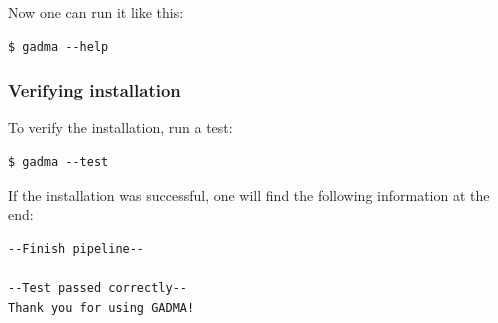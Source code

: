\documentclass[12pt]{article}
\begin{document}
Now one can run it like this:
\begin{lstlisting}
$ gadma --help
\end{lstlisting}

\subsubsection{Verifying installation}
To verify the installation, run a test:

\begin{lstlisting}
$ gadma --test
\end{lstlisting}

If the installation was successful, one will find the following information at the end:
\begin{lstlisting}
--Finish pipeline--

--Test passed correctly--
Thank you for using GADMA!
\end{lstlisting}
\end{document}
